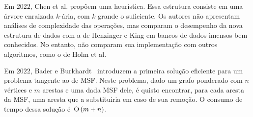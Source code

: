 
Em $2022$, Chen et al. \cite{QC22} propõem uma heurística. Essa estrutura consiste em uma árvore enraizada $k$-ária, com $k$ grande o suficiente. Os autores não apresentam análises de complexidade das operações, mas comparam o desempenho da nova estrutura de dados com a de Henzinger e King em bancos de dados imensos bem conhecidos. No entanto, não comparam sua implementação com outros algoritmos, como o de Holm et al.

Em $2022$, Bader e Burkhardt~\cite{simpleAndEfficient2022} introduzem a primeira solução eficiente para um problema tangente ao de MSF. Neste problema, dado um grafo ponderado com $n$ vértices e $m$ arestas e uma dada MSF dele, é quisto encontrar, para cada aresta da MSF, uma aresta que a substituiria em caso de sua remoção. O consumo de tempo dessa solução é~$\text{O}\left(m+n\right)$.





